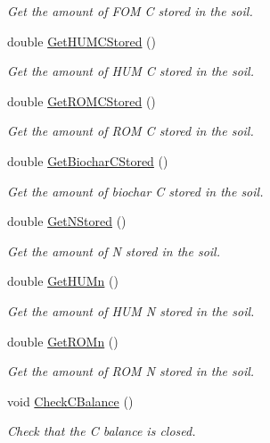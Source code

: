 \begin{DoxyCompactItemize}
\begin{DoxyCompactList}\small\item\em Get the amount of F\+OM C stored in the soil. \end{DoxyCompactList}\item 
double \mbox{\hyperlink{classctool2_af39503c35e1348a77007bb8d52afb436}{Get\+H\+U\+M\+C\+Stored}} ()
\begin{DoxyCompactList}\small\item\em Get the amount of H\+UM C stored in the soil. \end{DoxyCompactList}\item 
double \mbox{\hyperlink{classctool2_a88804d7d3fe9b3132085ce9db3c16b80}{Get\+R\+O\+M\+C\+Stored}} ()
\begin{DoxyCompactList}\small\item\em Get the amount of R\+OM C stored in the soil. \end{DoxyCompactList}\item 
double \mbox{\hyperlink{classctool2_a204d6d2b7576bb7d3c52ac152c637958}{Get\+Biochar\+C\+Stored}} ()
\begin{DoxyCompactList}\small\item\em Get the amount of biochar C stored in the soil. \end{DoxyCompactList}\item 
double \mbox{\hyperlink{classctool2_a17a35e9c9faa7486c87fea08796c64de}{Get\+N\+Stored}} ()
\begin{DoxyCompactList}\small\item\em Get the amount of N stored in the soil. \end{DoxyCompactList}\item 
double \mbox{\hyperlink{classctool2_a4a12ce36b7e85a06e7987e953b08b876}{Get\+H\+U\+Mn}} ()
\begin{DoxyCompactList}\small\item\em Get the amount of H\+UM N stored in the soil. \end{DoxyCompactList}\item 
double \mbox{\hyperlink{classctool2_a31a62472fb74dbafbc296ecd074c8d5e}{Get\+R\+O\+Mn}} ()
\begin{DoxyCompactList}\small\item\em Get the amount of R\+OM N stored in the soil. \end{DoxyCompactList}\item 
void \mbox{\hyperlink{classctool2_ab9e6dc7d7c67b8956d4d5284c32c881b}{Check\+C\+Balance}} ()
\begin{DoxyCompactList}\small\item\em Check that the C balance is closed. \end{DoxyCompactList}\item 

\end{DoxyCompactItemize}
